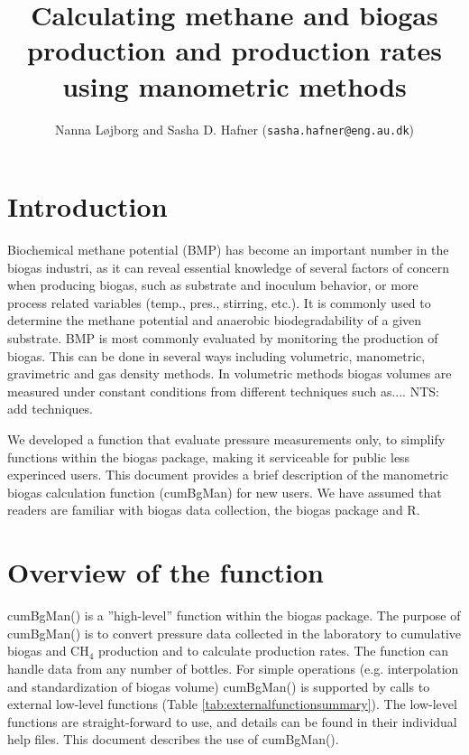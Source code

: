 \documentclass{article}
\title{Calculating methane and biogas production and production rates using manometric methods}
\author{Nanna Løjborg and Sasha D. Hafner (\texttt{sasha.hafner@eng.au.dk})}
\begin{document}


\maketitle

\section{Introduction}
Biochemical methane potential (BMP) has become an important number in the biogas industri, as it can reveal essential knowledge of several factors of concern when producing biogas, such as substrate and inoculum behavior, or more process related variables (temp., pres., stirring, etc.). It is commonly used to determine the methane potential and anaerobic biodegradability of a given substrate. 
BMP is most commonly evaluated by monitoring the production of biogas. This can be done in several ways including volumetric, manometric, gravimetric and gas density methods. In volumetric methods biogas volumes are measured under constant conditions from different techniques such as.... NTS: add techniques. 

We developed a function that evaluate pressure measurements only, to simplify functions within the biogas package, making it serviceable for public less experinced users. 
This document provides a brief description of the manometric biogas calculation function (cumBgMan) for new users.
We have assumed that readers are familiar with biogas data collection, the biogas package and R.

\section{Overview of the function}
cumBgMan() is a ''high-level'' function within the biogas package. The purpose of cumBgMan() is to convert pressure data collected in the laboratory to cumulative biogas and CH$_4$ production and to calculate production rates. The function can handle data from any number of bottles. For simple operations (e.g. interpolation and standardization of biogas volume) cumBgMan() is supported by calls to external low-level functions (Table \ref{tab:externalfunctionsummary}). The low-level functions are straight-forward to use, and details can be found in their individual help files.
This document describes the use of cumBgMan(). 
\end{document}
